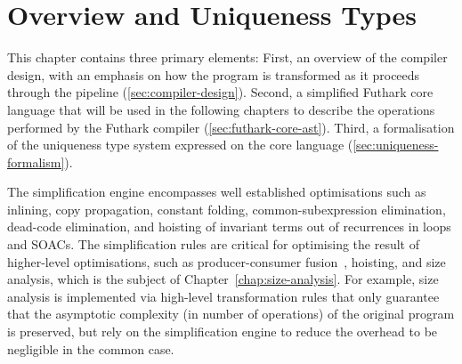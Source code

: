 \renewcommand{\sp}{\quad}
\newcommand{\ft}{\phi}
\newcommand{\fts}{\varphi}
\newcommand{\tty}{\rho}
\newcommand{\utty}{\hat{\rho}}
\newcommand{\sembox}[1]{\hfill \normalfont \mbox{\fbox{\(#1\)}}}
\newcommand{\sempart}[2]{\textrm{\textit{#1 \sembox{#2}}}}
\newcommand{\vdb}{\vd_\textrm{b}}
\newcommand{\vde}{\vd_\textrm{e}}
\newcommand{\vdp}{\vd_\textrm{p}}
\newcommand{\vdhp}{\vd_{\hat{\textrm{p}}}}
\newcommand{\vdP}{\vd_\textrm{P}}
\newcommand{\vda}{\vd_\textrm{a}}
\newcommand{\fracc}[2]{\begin{eqnarray} \inference{#1
    }{#2}\end{eqnarray}}
\newcommand{\fraccn}[2]{\refstepcounter{equation}\mbox{$\inference{#1}{#2}$}~(\arabic{equation})}
\newcommand{\fraccc}[2]{\mbox{$\frac{\begin{array}{c} #1 \end{array}}{\begin{array}{c} #2 \end{array}}$}}
\newcommand{\fn}{\ensuremath{\lambda}}
\newcommand{\Fn}[3]{\fn#2:~#1~\rightarrow #3}
\newcommand{\FnU}[2]{\fn#1~\rightarrow #2}
\newcommand{\ubar}[1]{\underline{#1}}
\newcommand{\utau}{\hat{\tau}}
\newcommand{\etau}{\ubar{\tau}}
\newcommand{\opty}{\ubar{\phi}}
\newcommand{\Fun}[4]{\mbox{\lstinline[mathescape]!let\ #1\ #2\ :\ #3 =\ #4!}}

\chapter{Overview and Uniqueness Types}

This chapter contains three primary elements: First, an overview of
the compiler design, with an emphasis on how the program is
transformed as it proceeds through the pipeline
(\cref{sec:compiler-design}).  Second, a simplified Futhark core
language that will be used in the following chapters to describe the
operations performed by the Futhark compiler
(\cref{sec:futhark-core-ast}).  Third, a formalisation of the
uniqueness type system expressed on the core language
(\cref{sec:uniqueness-formalism}).

The simplification engine encompasses well established optimisations
such as inlining, copy propagation, constant folding,
common-subexpression elimination, dead-code elimination, and hoisting
of invariant terms out of recurrences in loops and SOACs.  The
simplification rules are critical for optimising the result of
higher-level optimisations, such as producer-consumer
fusion~\cite{henriksen2014exploiting,henriksen2013t2}, hoisting, and
size analysis, which is the subject of
Chapter~\ref{chap:size-analysis}.  For example, size analysis is
implemented via high-level transformation rules that only guarantee
that the asymptotic complexity (in number of operations) of the
original program is preserved, but rely on the simplification engine
to reduce the overhead to be negligible in the common case.

